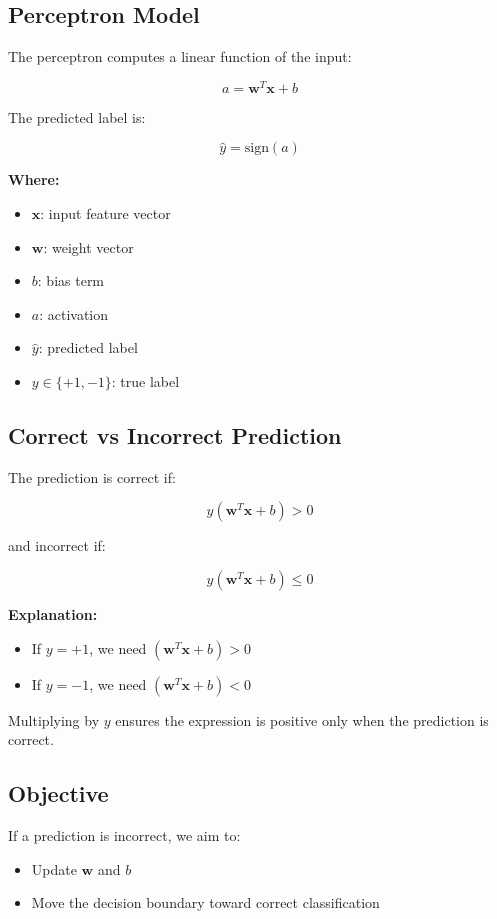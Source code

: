\documentclass[12pt,a4paper]{article}
\begin{document}
\subsection{Perceptron Model}

The perceptron computes a linear function of the input:

\[
a = \mathbf{w}^T \mathbf{x} + b
\]

The predicted label is:

\[
\hat{y} = \text{sign}(a)
\]

\textbf{Where:}
\begin{itemize}
    \item $\mathbf{x}$: input feature vector
    \item $\mathbf{w}$: weight vector
    \item $b$: bias term
    \item $a$: activation
    \item $\hat{y}$: predicted label
    \item $y \in \{+1, -1\}$: true label
\end{itemize}

\subsection{Correct vs Incorrect Prediction}

The prediction is correct if:

\[
y(\mathbf{w}^T \mathbf{x} + b) > 0
\]

and incorrect if:

\[
y(\mathbf{w}^T \mathbf{x} + b) \leq 0
\]

\textbf{Explanation:}

\begin{itemize}
    \item If $y = +1$, we need $(\mathbf{w}^T \mathbf{x} + b) > 0$
    \item If $y = -1$, we need $(\mathbf{w}^T \mathbf{x} + b) < 0$
\end{itemize}

Multiplying by $y$ ensures the expression is positive only when the prediction is correct.

\subsection{Objective}

If a prediction is incorrect, we aim to:
\begin{itemize}
    \item Update $\mathbf{w}$ and $b$
    \item Move the decision boundary toward correct classification
\end{itemize}
\end{document}
